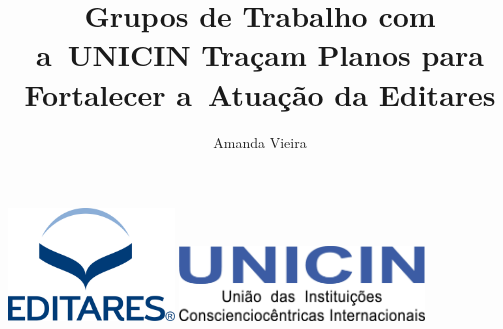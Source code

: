 \documentclass{gescons}
\author{Amanda Vieira}
\title{Grupos de Trabalho com a~UNICIN Traçam Planos para Fortalecer a~Atuação da Editares}
\begin{document}
    \makeentrevistatitle



\begin{center}
    \hspace{0.5cm}
    \includegraphics[height=3cm]{images/Logo-Editares-com-Marca-Registrada}
    \hspace{3cm}
    \includegraphics[height=2cm]{images/Unicin-Logo-1024x315} 
\end{center}
\end{document}
